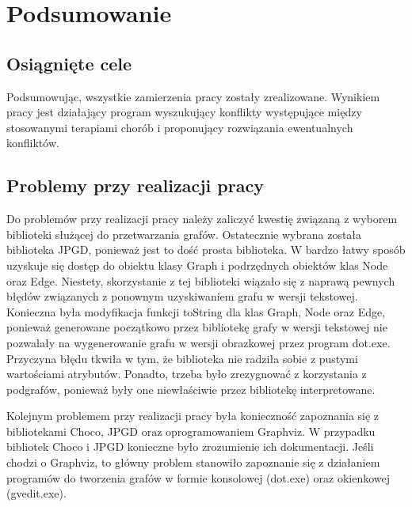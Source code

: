 \chapter{Podsumowanie}

\section{Osiągnięte cele}

Podsumowując, wszystkie zamierzenia pracy zostały zrealizowane. Wynikiem pracy jest działający program wyszukujący konflikty występujące między stosowanymi terapiami chorób i proponujący rozwiązania ewentualnych konfliktów. 

\section{Problemy przy realizacji pracy}
Do problemów przy realizacji pracy należy zaliczyć kwestię związaną z wyborem biblioteki służącej do przetwarzania grafów. Ostatecznie wybrana została biblioteka JPGD, ponieważ jest to dość prosta biblioteka. W bardzo łatwy sposób uzyskuje się dostęp do obiektu klasy Graph i podrzędnych obiektów klas Node oraz Edge. Niestety, skorzystanie z tej biblioteki wiązało się z naprawą pewnych błędów związanych z ponownym uzyskiwaniem grafu w wersji tekstowej. Konieczna była modyfikacja funkcji toString dla klas Graph, Node oraz Edge, ponieważ generowane początkowo przez bibliotekę grafy w wersji tekstowej nie pozwalały na wygenerowanie grafu w wersji obrazkowej przez program dot.exe. Przyczyna błędu tkwiła w tym, że biblioteka nie radziła sobie z pustymi wartościami atrybutów. Ponadto, trzeba było zrezygnować z korzystania z podgrafów, ponieważ były one niewłaściwie przez bibliotekę interpretowane. 

Kolejnym problemem przy realizacji pracy była konieczność zapoznania się z bibliotekami Choco, JPGD oraz oprogramowaniem Graphviz. W przypadku bibliotek Choco i JPGD konieczne było zrozumienie ich dokumentacji. Jeśli chodzi o Graphviz, to główny problem stanowiło zapoznanie się z działaniem programów do tworzenia grafów w formie konsolowej (dot.exe) oraz okienkowej (gvedit.exe).

